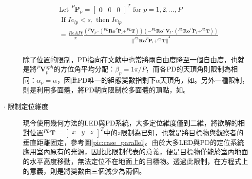 \begin{description}
            \begin{equation}
                \label{eqn:model_config_restrict}
                \begin{aligned}
                    &\text{Let }
                    ^P\boldsymbol{P}_p=
                    \left[\begin{array}{ccc}0&0&0\end{array}\right]^T
                    \text{ for } p = 1,2,...,P\\
                    &\text { If } Ie_{lp}<s ,\text{ then }Ie_{lp} \\
                        &= \frac{ReAPt}{ \pi}
                    \frac{
                            {( ^{P}\boldsymbol{V}_p \cdot 
                                (
                                    ^{PL} \boldsymbol{Ro}^{P}\boldsymbol{P}_l
                                    + ^{PL}\boldsymbol{T}
                                )
                            )}
                    {
                                (
                                    -^{PL}\boldsymbol{Ro}^{L}\boldsymbol{V}_l 
                                    \cdot 
                                    (
                                        ^{PL}\boldsymbol{Ro}^{P}\boldsymbol{P}_l
                                        +^{PL}\boldsymbol{T}
                                    )
                                )
                            } } 
                        {
                            {
                                ||
                                    ^{PL}\boldsymbol{Ro}^{P}\boldsymbol{P}_l+^{PL}\boldsymbol{T}
                                ||
                            }^{4}
                        }\\
                \end{aligned}
            \end{equation}

            \qquad
            除了位置的限制，PD指向在文獻中也常將兩自由度降至一個自由度，也就是將$^P\boldsymbol{V}_p^{sph}$的方位角平均分配：$\beta_p = 1\pi/P$，而各PD的天頂角則限制為相同：$\alpha_p = \alpha$，因此PD唯一的組態變數指剩下$\alpha$天頂角，如\cite{case:cart2d}\cite{case:cart3d}\cite{case:3d_layers}。另外一種限制，則是利用多面體，將PD朝向限制於多面體的頂點，如\cite{case:ml}。

            \item[$\cdot$ 限制定位維度]\hfill
            
            \qquad 
            現今使用幾何方法的LED與PD系統，大多定位維度僅到二維\cite{survey_light2018}，將欲解的相對位置$^{PL}\boldsymbol{T}=\left[\begin{array}{ccc}x&y&z\end{array}\right]^T$中的$z$限制為已知，也就是將目標物與觀察者的垂直距離固定，參考圖\ref{pic:case_parallel}。由於大多LED與PD的定位系統應用室內原有的光源，因此此限制代表的意義，便是目標物僅能於室內地面的水平高度移動，無法定位不在地面上的目標物。透過此限制，在方程式上的意義，則是將變數由三個減少為兩個。


\end{description}
